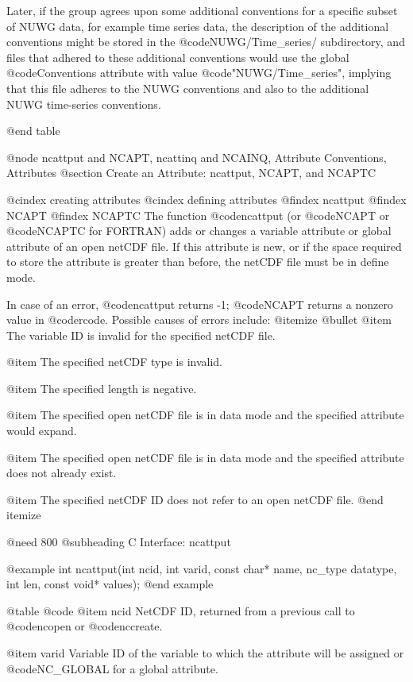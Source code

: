 {Later, if the group agrees upon some additional conventions for a specific
subset of NUWG data, for example time series data, the description of the
additional conventions might be stored in the @code{NUWG/Time_series/}
subdirectory, and files that adhered to these additional conventions would
use the global @code{Conventions} attribute with value
@code{"NUWG/Time_series"}, implying that this file adheres to the NUWG
conventions and also to the additional NUWG time-series conventions.

@end table


@node ncattput and NCAPT, ncattinq and NCAINQ, Attribute Conventions, Attributes
@section Create an Attribute:  ncattput, NCAPT, and NCAPTC

@cindex creating attributes
@cindex defining attributes
@findex ncattput
@findex NCAPT
@findex NCAPTC
The function @code{ncattput} (or @code{NCAPT} or @code{NCAPTC} for
FORTRAN) adds or changes a variable attribute or global attribute of an
open netCDF file.  If this attribute is new, or if the space required to
store the attribute is greater than before, the netCDF file must be in
define mode.

In case of an error, @code{ncattput} returns -1; @code{NCAPT} returns a
nonzero value in @code{rcode}.  Possible causes of errors include:
@itemize @bullet
@item
The variable ID is invalid for the specified netCDF file.

@item
The specified netCDF type is invalid.

@item
The specified length is negative.

@item
The specified open netCDF file is in data mode and the specified
attribute would expand.

@item
The specified open netCDF file is in data mode and the specified
attribute does not already exist.

@item
The specified netCDF ID does not refer to an open netCDF file.
@end itemize

@need 800
@subheading C Interface:  ncattput

@example
int ncattput(int ncid, int varid, const char* name, nc_type datatype,
             int len, const void* values);
@end example

@table @code
@item ncid
NetCDF ID, returned from a previous call to @code{ncopen} or @code{nccreate}.

@item varid
Variable ID of the variable to which the attribute will be assigned or
@code{NC_GLOBAL} for a global attribute.

}
